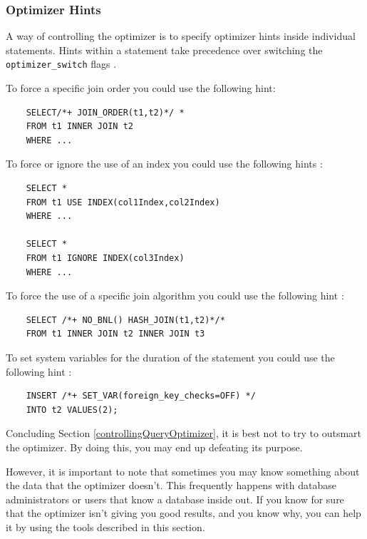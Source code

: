 \documentclass[12pt]{article}
\begin{document}
\subsubsection{Optimizer Hints}
\label{optimizerHints}
A way of controlling the optimizer is to specify optimizer hints inside individual statements. Hints within a statement take precedence over switching the \verb|optimizer_switch| flags \parencite{OptimizerHints}.

\vspace{0.3cm}
\noindent To force a specific join order you could use the following hint:
\begin{verbatim}
    SELECT/*+ JOIN_ORDER(t1,t2)*/ * 
    FROM t1 INNER JOIN t2 
    WHERE ...
\end{verbatim}

\vspace{0.3cm}
\noindent To force or ignore the use of an index you could use the following hints \parencite{IndexHints}:
\begin{verbatim}
    SELECT * 
    FROM t1 USE INDEX(col1Index,col2Index)
    WHERE ...
    
    SELECT * 
    FROM t1 IGNORE INDEX(col3Index)
    WHERE ...
\end{verbatim}

\vspace{0.3cm}
\noindent To force the use of a specific join algorithm you could use the following hint \parencite{OptimizerHints}:
\begin{verbatim}
    SELECT /*+ NO_BNL() HASH_JOIN(t1,t2)*/*
    FROM t1 INNER JOIN t2 INNER JOIN t3
\end{verbatim}

\vspace{0.3cm}
\noindent To set system variables for the duration of the statement you could use the following hint \parencite{OptimizerHints}:
\begin{verbatim}
    INSERT /*+ SET_VAR(foreign_key_checks=OFF) */ 
    INTO t2 VALUES(2);
\end{verbatim}


\vspace{0.3cm}

Concluding Section \ref{controllingQueryOptimizer}, it is best not to try to outsmart the optimizer. By doing this, you may end up defeating its purpose.

However, it is important to note that sometimes you may know something about the data that the optimizer doesn't. This frequently happens with database administrators or users that know a database inside out. If you know for sure that the optimizer isn't giving you good results, and you know why, you can help it by using the tools described in this section.
\end{document}
